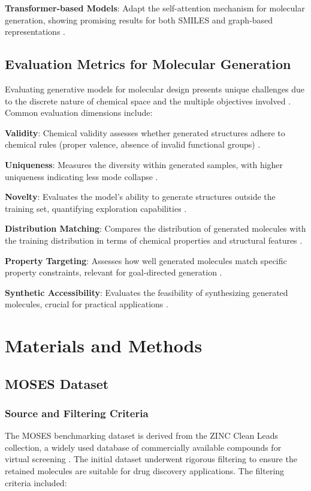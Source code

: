\documentclass[conference]{IEEEtran}
\begin{document}
\textbf{Transformer-based Models}: Adapt the self-attention mechanism for molecular generation, showing promising results for both SMILES and graph-based representations \cite{Honda2019, Maziarka2020, Irwin2022}.

\subsection{Evaluation Metrics for Molecular Generation}
Evaluating generative models for molecular design presents unique challenges due to the discrete nature of chemical space and the multiple objectives involved \cite{Brown2019}. Common evaluation dimensions include:

\textbf{Validity}: Chemical validity assesses whether generated structures adhere to chemical rules (proper valence, absence of invalid functional groups) \cite{Polykovskiy2020}.

\textbf{Uniqueness}: Measures the diversity within generated samples, with higher uniqueness indicating less mode collapse \cite{Brown2019}.

\textbf{Novelty}: Evaluates the model's ability to generate structures outside the training set, quantifying exploration capabilities \cite{Segler2018}.

\textbf{Distribution Matching}: Compares the distribution of generated molecules with the training distribution in terms of chemical properties and structural features \cite{Preuer2018}.

\textbf{Property Targeting}: Assesses how well generated molecules match specific property constraints, relevant for goal-directed generation \cite{Olivecrona2017}.

\textbf{Synthetic Accessibility}: Evaluates the feasibility of synthesizing generated molecules, crucial for practical applications \cite{Ertl2009}.

\section{Materials and Methods}

\subsection{MOSES Dataset}
\subsubsection{Source and Filtering Criteria}
The MOSES benchmarking dataset is derived from the ZINC Clean Leads collection, a widely used database of commercially available compounds for virtual screening \cite{Sterling2015}. The initial dataset underwent rigorous filtering to ensure the retained molecules are suitable for drug discovery applications. The filtering criteria included:
\end{document}

